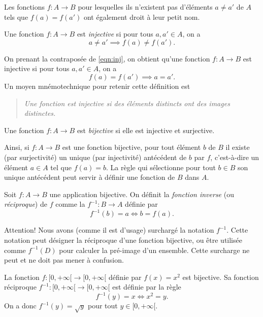 \documentclass[french,course,oneside,theoremnosection]{lecture}
\begin{document}
Les fonctions $f\colon A \to B$ pour lesquelles ils n'existent pas d'éléments $a\neq a'$ de $A$ tels que $f(a) =f(a')$ ont également droit à leur petit nom.
\begin{definition}
Une fonction $f\colon A \to B$ est \emph{injective} si pour tous $a,a' \in A$, on a
\begin{equation}\label{eqn:inj}
a \neq a' \implies f(a)\neq f(a').
\end{equation}
\end{definition}
On prenant la contraposée de \eqref{eqn:inj}, on obtient qu'une fonction $f\colon A \to B$ est injective si pour tous $a,a'\in A$, on a
\[
f(a) = f(a') \implies a=a'.
\] 
Un moyen mnémotechnique pour retenir cette définition est
\begin{quotation}
\emph{Une fonction est injective si des éléments distincts ont des images distinctes.}
\end{quotation}

\begin{definition}
Une fonction $f\colon A \to B$ est \emph{bijective} si elle est injective et surjective.
\end{definition}

Ainsi, si $f\colon A \to B$ est une fonction bijective, pour tout élément $b$ de $B$ il existe (par surjectivité) un unique (par injectivité) antécédent de $b$ par $f$, c'est-à-dire un élément $a\in A$ tel que $f(a)=b$. La règle qui sélectionne pour tout $b\in B$ son unique antécédent peut servir à définir une fonction de $B$ dans $A$.

\begin{definition}
Soit $f\colon A \to B$ une application bijective. On définit la \emph{fonction inverse} (ou \emph{réciproque}) de $f$ comme la  $f^{-1}\colon B \to A$ définie par
\[
f^{-1}(b) = a \iff b=f(a).
\]
\end{definition}
\begin{remark}
Attention! Nous avons (comme il est d'usage) surchargé la notation $f^{-1}$. Cette notation peut désigner la réciproque d'une fonction bijective, ou être utilisée comme $f^{-1}(D)$ pour calculer la pré-image d'un ensemble. Cette surcharge ne peut et ne doit pas mener à confusion.
\end{remark}

\begin{example}
La fonction $f\colon [0,+\infty[ \to [0, +\infty[$ définie par $f(x)=x^2$ est bijective. Sa fonction réciproque $f^{-1}\colon [0, +\infty[ \to [0, +\infty[$ est définie par la règle
\[
f^{-1}(y)=x \iff x^2=y.
\]
On a donc $f^{-1}(y)=\sqrt{y}$ pour tout $y\in [0, +\infty[$.
\end{example}
\end{document}

